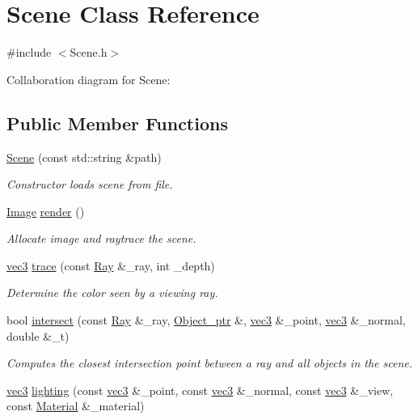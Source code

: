 \hypertarget{classScene}{}\section{Scene Class Reference}
\label{classScene}


{\ttfamily \#include $<$Scene.\+h$>$}



Collaboration diagram for Scene\+:
\subsection*{Public Member Functions}
\begin{DoxyCompactItemize}
\item 
\hyperlink{classScene_a53cd40de123db36ab62763523ec0fc41}{Scene} (const std\+::string \&path)
\begin{DoxyCompactList}\small\item\em Constructor loads scene from file. \end{DoxyCompactList}\item 
\hyperlink{classImage}{Image} \hyperlink{classScene_aeaecd6069dfc02986fd04c9a8f905e89}{render} ()
\begin{DoxyCompactList}\small\item\em Allocate image and raytrace the scene. \end{DoxyCompactList}\item 
\hyperlink{classvec3}{vec3} \hyperlink{classScene_aee2e562b23da56880ea30e33f9e76e1b}{trace} (const \hyperlink{classRay}{Ray} \&\+\_\+ray, int \+\_\+depth)
\begin{DoxyCompactList}\small\item\em Determine the color seen by a viewing ray. \end{DoxyCompactList}\item 
bool \hyperlink{classScene_addfa0f2a14f2593e7f91dab0d5627990}{intersect} (const \hyperlink{classRay}{Ray} \&\+\_\+ray, \hyperlink{Object_8h_ad537f5b7b240eca7da458a29bbb47b9e}{Object\+\_\+ptr} \&, \hyperlink{classvec3}{vec3} \&\+\_\+point, \hyperlink{classvec3}{vec3} \&\+\_\+normal, double \&\+\_\+t)
\begin{DoxyCompactList}\small\item\em Computes the closest intersection point between a ray and all objects in the scene. \end{DoxyCompactList}\item 
\hyperlink{classvec3}{vec3} \hyperlink{classScene_a8c3c270f36a5e73805d925763450de7c}{lighting} (const \hyperlink{classvec3}{vec3} \&\+\_\+point, const \hyperlink{classvec3}{vec3} \&\+\_\+normal, const \hyperlink{classvec3}{vec3} \&\+\_\+view, const \hyperlink{structMaterial}{Material} \&\+\_\+material)

\end{DoxyCompactItemize}
